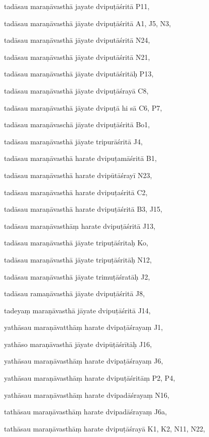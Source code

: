 \begin{marma}[hp03_012]


\item[tadāsau maraṇāvasthā jayate dvipuṭāśritā] P11,
\item[tadāsau maraṇāvasthā jāyate dvipuṭāśritā] A1, J5, N3, 
\item[tadāsau maraṇāvasthā jāyate dviputāśritā] N24,
\item[tadāsau maraṇāvasthā jāyate dviputāśritā] N21,
\item[tadāsau maraṇāvasthā jāyate dviputāśritāḥ] P13,
\item[tadāsau maraṇāvasthā jāyate dvipuṭāśrayā] C8,
\item[tadāsau maraṇāvasthā jāyate dvipuṭā hi sā] C6, P7,
\item[tadāsau maraṇāvaschā jāyate dvipuṭāśritā] Bo1, 
\item[tadāsau maraṇāvasthā jāyate tripurāśritā] J4, 
\item[tadāsau maraṇāvasthā harate dvipuṭamāśritā] B1, 
\item[tadāsau maraṇāvasthā harate dvipūtāśrayī] N23,
\item[tadāsau maraṇāvasthā harate dvipuṭaśritā] C2,
\item[tadāsau maraṇāvasthā harate dvipuṭāśritā] B3, J15, 
\item[tadāsau maraṇāvasthāṃ harate dvipuṭāśritā] J13, 
\item[tadāsau maraṇāvasthā jāyate tripuṭāśritaḥ] Ko,
\item[tadāsau maraṇāvasthā jāyate tripuṭāśritāḥ] N12,
\item[tadāsau maraṇāvasthā jāyate trimuṭāśratāḥ] J2,
\item[tadāsau ramaṇāvasthā jāyate dvipuṭāśritā] J8,
\item[tadeyaṃ maraṇāvasthā jāyate dvipuṭāśritā] J14,
\item[yathāsau maraṇāvatthāṃ harate dvipaṭāśrayaṃ] J1,
\item[yathāso maraṇāvasthā jāyate dvipūṭāśrītāḥ] J16,
\item[yathāsau maraṇāvasthāṃ harate dvipaṭāśrayaṃ] J6,
\item[yathāsau maraṇāvasthāṃ harate dvipuṭāśritāṃ] P2, P4, 
\item[yathāsau maraṇāvasthāṃ harate dvipadāśrayaṃ] N16,
\item[tathāsau maraṇāvasthāṃ harate dvipadāśrayaṃ] J6a,
\item[tathāsau maraṇāvasthāṃ harate dvipuṭāśrayā] K1, K2, N11, N22, 

\end{marma}

